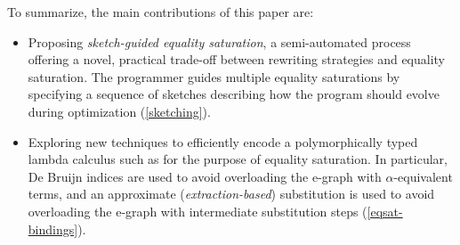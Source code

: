 \smallskip

To summarize, the main contributions of this paper are:
\begin{itemize}
  \item Proposing \emph{sketch-guided equality saturation}, a semi-automated process offering a novel, practical trade-off between rewriting strategies and equality saturation.
  The programmer guides multiple equality saturations by specifying a sequence of sketches describing how the program should evolve during optimization (\cref{sketching}).
  
  \item Exploring new techniques to efficiently encode a polymorphically typed lambda calculus such as \Rise{} for the purpose of equality saturation.
  In particular, De Bruijn indices are used to avoid overloading the e-graph with $\alpha$-equivalent terms, and an approximate (\emph{extraction-based}) substitution is used to avoid overloading the e-graph with intermediate substitution steps (\cref{eqsat-bindings}).

  
  


\end{itemize}
